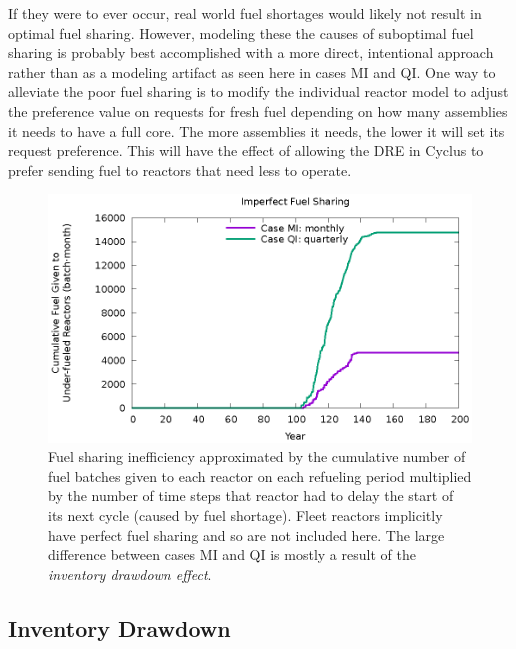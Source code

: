 \documentclass{style}
\begin{document}
If they were to ever occur, real world fuel shortages would likely not result
in optimal fuel sharing. However, modeling these the causes of suboptimal fuel
sharing is probably best accomplished with a more direct, intentional approach
rather than as a modeling artifact as seen here in cases MI and QI.  One way to
alleviate the poor fuel sharing is to modify the individual reactor model to
adjust the preference value on requests for fresh fuel depending on how many
assemblies it needs to have a full core.  The more assemblies it needs, the
lower it will set its request preference.  This will have the effect of
allowing the DRE in Cyclus to prefer sending
fuel to reactors that need less to operate.

\begin{figure}[!h]
    \centering
    \includegraphics[width=1.0\columnwidth]{exp2/badshare.eps}
    \caption[Cumulative unnecessary idling fuel]{
        Fuel sharing inefficiency approximated by the cumulative number of
        fuel batches given to each reactor on each refueling period multiplied
        by the number of time steps that reactor had to delay the start of its
        next cycle (caused by fuel shortage).  Fleet reactors implicitly have perfect fuel
        sharing and so are not included here. The large difference
        between cases MI and QI is mostly a result of the \emph{inventory drawdown
        effect}. 
    }
    \label{fig:badshare}
\end{figure}

\subsection{Inventory Drawdown}
\end{document}

